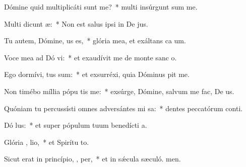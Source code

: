 \item Dómine quid multiplicáti sunt   me?~* multi insúrgunt sum me.
\item Multi dicunt  æ:~* Non est salus ipsi in De jus.
\item Tu autem, Dómine,  us es,~* glória mea, et exáltans ca um.
\item Voce mea ad Dó vi:~* et exaudívit me de monte sanc o.
\item Ego dormívi,  tus sum:~* et exsurréxi, quia Dóminus pit me.
\item Non timébo míllia pópu tis me:~* exsúrge, Dómine, salvum me fac, De us.
\item Quóniam tu percussísti omnes adversántes mi  sa:~* dentes peccatórum conti.
\item Dó  lus:~* et super pópulum tuum benedícti a.
\item Glória ,  lio,~* et Spirítu to.
\item Sicut erat in princípio,  ,  per,~* et in sǽcula sæculó. men.
